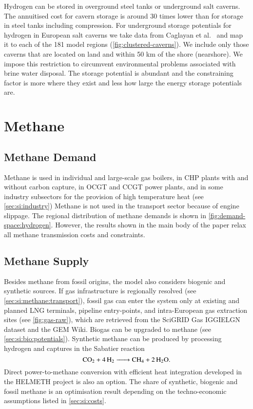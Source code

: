 Hydrogen can be stored in overground steel tanks or underground salt caverns.
The annuitised cost for cavern storage is around 30 times lower than for storage
in steel tanks including compression. For underground storage potentials for
hydrogen in European salt caverns we take data from Caglayan et
al.~ and map it to
each of the 181 model regions (\cref{fig:clustered-caverns}). We include only
those caverns that are located on land and within 50 km of the shore
(nearshore). We impose this restriction to circumvent environmental problems
associated with brine water disposal. The
storage potential is abundant and the constraining factor is more where they
exist and less how large the energy storage potentials are.

\section{Methane}
\label{sec:si:methane}

\subsection{Methane Demand}
\label{sec:si:methane:demand}

Methane is used in individual and large-scale gas boilers, in CHP plants with
and without carbon capture, in OCGT and CCGT power plants, and in some industry
subsectors for the provision of high temperature heat (see
\cref{sec:si:industry}) Methane is not used in the transport sector because of
engine slippage.  The regional distribution of methane demands is shown in
\cref{fig:demand-space:hydrogen}. However, the results shown in the main body of
the paper relax all methane transmission costs and constraints.

\subsection{Methane Supply}
\label{sec:si:methane:supply}

Besides methane from fossil origins, the model also considers biogenic and
synthetic sources. If gas infrastructure is regionally resolved (see
\cref{sec:si:methane:transport}), fossil gas can enter the system only at
existing and planned LNG terminals, pipeline entry-points, and intra-European
gas extraction sites (see \cref{fig:gas-raw}), which are retrieved from the
SciGRID Gas IGGIELGN dataset and the GEM
Wiki. Biogas can be upgraded to methane (see
\cref{sec:si:bio:potentials}). Synthetic methane can be produced by processing
hydrogen and captures \co in the Sabatier reaction
\begin{equation}
    \ce{CO2 + 4H2 -> CH4 + 2H2O}.
\end{equation}
Direct power-to-methane conversion with efficient heat integration developed in
the HELMETH project is also an option. The
share of synthetic, biogenic and fossil methane is an optimisation result
depending on the techno-economic assumptions listed in \cref{sec:si:costs}.

